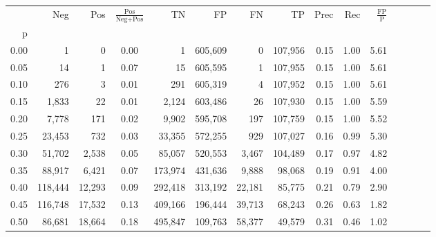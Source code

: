 \begin{tabular}{rrrcrrrrrrrrrrr}
\toprule
{} &      Neg &     Pos & $\frac{\text{Pos}}{\text{Neg}+\text{Pos}}$ &       TN &       FP &       FN &       TP &  Prec &   Rec & $\frac{\text{FP}}{\text{P}}$ \\
p    &          &         &                                            &          &          &          &          &       &       &                              \\
\midrule
0.00 &        1 &       0 &                                       0.00 &        1 &  605,609 &        0 &  107,956 &  0.15 &  1.00 &                         5.61 \\
0.05 &       14 &       1 &                                       0.07 &       15 &  605,595 &        1 &  107,955 &  0.15 &  1.00 &                         5.61 \\
0.10 &      276 &       3 &                                       0.01 &      291 &  605,319 &        4 &  107,952 &  0.15 &  1.00 &                         5.61 \\
0.15 &    1,833 &      22 &                                       0.01 &    2,124 &  603,486 &       26 &  107,930 &  0.15 &  1.00 &                         5.59 \\
0.20 &    7,778 &     171 &                                       0.02 &    9,902 &  595,708 &      197 &  107,759 &  0.15 &  1.00 &                         5.52 \\
0.25 &   23,453 &     732 &                                       0.03 &   33,355 &  572,255 &      929 &  107,027 &  0.16 &  0.99 &                         5.30 \\
0.30 &   51,702 &   2,538 &                                       0.05 &   85,057 &  520,553 &    3,467 &  104,489 &  0.17 &  0.97 &                         4.82 \\
0.35 &   88,917 &   6,421 &                                       0.07 &  173,974 &  431,636 &    9,888 &   98,068 &  0.19 &  0.91 &                         4.00 \\
0.40 &  118,444 &  12,293 &                                       0.09 &  292,418 &  313,192 &   22,181 &   85,775 &  0.21 &  0.79 &                         2.90 \\
0.45 &  116,748 &  17,532 &                                       0.13 &  409,166 &  196,444 &   39,713 &   68,243 &  0.26 &  0.63 &                         1.82 \\
0.50 &   86,681 &  18,664 &                                       0.18 &  495,847 &  109,763 &   58,377 &   49,579 &  0.31 &  0.46 &                         1.02 \\

\end{tabular}
